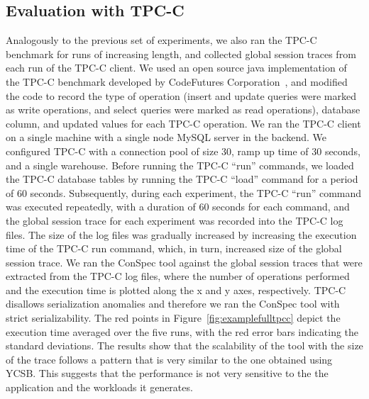 \documentclass[journal,compsoc]{IEEEtran}
\begin{document}
 \subsection{Evaluation with TPC-C}\label{sec:evaltpcc}
 Analogously to the previous set of experiments, we also ran the TPC-C benchmark for runs of increasing length, and collected global session traces from each run of the TPC-C client. We used an open source java implementation of the TPC-C benchmark developed by CodeFutures Corporation~\cite{Tpcc2015}, and modified the code to record the type of operation  (insert and update queries were marked as write operations, and select queries were marked as read operations), database column, and updated values for each TPC-C operation.  We ran the TPC-C client on a single  machine with a single node MySQL server in the backend. We configured TPC-C with a connection pool of size 30, ramp up time of 30 seconds, and a single warehouse. Before running the TPC-C ``run'' commands, we loaded the TPC-C database tables by running the TPC-C ``load'' command for a period of 60 seconds. Subsequently,  during each experiment, the TPC-C ``run'' command was executed repeatedly, with a duration of 60 seconds for each command, and the global session trace for each experiment was recorded into the TPC-C log files. The size of the log files was gradually increased by increasing the execution time of the TPC-C run command, which, in turn, increased size of the global session trace.  We ran the ConSpec tool against the global session traces that were extracted from the TPC-C log files, where the number of operations performed and the execution time is plotted along the x and y axes, respectively. TPC-C  disallows serialization anomalies and therefore we ran the ConSpec tool with strict serializability. The red points in Figure~\ref{fig:examplefulltpcc} depict the execution time averaged over the five runs, with the red error bars indicating the standard deviations.
The results show that the scalability of the tool with the size of the trace follows a pattern that is very similar to the one obtained using YCSB. This suggests that the performance is not very sensitive to the the application and the workloads it generates.
\end{document}
